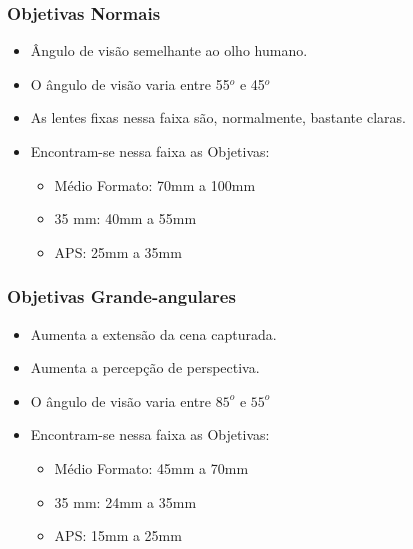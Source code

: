 
\begin{frame}
    \frametitle{Objetivas Normais}
    \begin{itemize}
        \item Ângulo de visão semelhante ao olho humano.
        \item O ângulo de visão varia entre 55$^o$ e 45$^o$
        \item As lentes fixas nessa faixa são, normalmente, bastante claras.
        \item Encontram-se nessa faixa as Objetivas:

        {\small \begin{itemize}
            \item Médio Formato: 70mm a 100mm
            \item 35 mm: 40mm a 55mm
            \item APS: 25mm a 35mm
        \end{itemize}}
    \end{itemize}
\end{frame}

\begin{frame}
    \frametitle{Objetivas Grande-angulares}
    \begin{itemize}
        \item Aumenta a extensão da cena capturada.
        \item Aumenta a percepção de perspectiva.
        \item O ângulo de visão varia entre $85^o$ e $55^o$
        \item Encontram-se nessa faixa as Objetivas:

        {\small \begin{itemize}
            \item Médio Formato: 45mm a 70mm
            \item 35 mm: 24mm a 35mm
            \item APS: 15mm a 25mm
        \end{itemize}}
    \end{itemize}
\end{frame}

